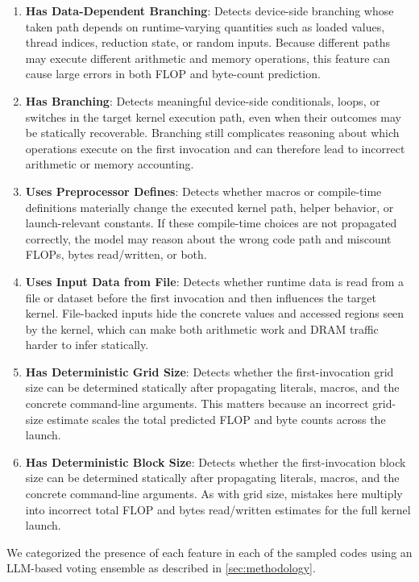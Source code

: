 \begin{enumerate}
    \item \textbf{Has Data-Dependent Branching}: Detects device-side branching whose taken path depends on runtime-varying quantities such as loaded values, thread indices, reduction state, or random inputs. Because different paths may execute different arithmetic and memory operations, this feature can cause large errors in both FLOP and byte-count prediction.
    \item \textbf{Has Branching}: Detects meaningful device-side conditionals, loops, or switches in the target kernel execution path, even when their outcomes may be statically recoverable. Branching still complicates reasoning about which operations execute on the first invocation and can therefore lead to incorrect arithmetic or memory accounting.
    \item \textbf{Uses Preprocessor Defines}: Detects whether macros or compile-time definitions materially change the executed kernel path, helper behavior, or launch-relevant constants. If these compile-time choices are not propagated correctly, the model may reason about the wrong code path and miscount FLOPs, bytes read/written, or both.
    \item \textbf{Uses Input Data from File}: Detects whether runtime data is read from a file or dataset before the first invocation and then influences the target kernel. File-backed inputs hide the concrete values and accessed regions seen by the kernel, which can make both arithmetic work and DRAM traffic harder to infer statically.
    \item \textbf{Has Deterministic Grid Size}: Detects whether the first-invocation grid size can be determined statically after propagating literals, macros, and the concrete command-line arguments. This matters because an incorrect grid-size estimate scales the total predicted FLOP and byte counts across the launch.
    \item \textbf{Has Deterministic Block Size}: Detects whether the first-invocation block size can be determined statically after propagating literals, macros, and the concrete command-line arguments. As with grid size, mistakes here multiply into incorrect total FLOP and bytes read/written estimates for the full kernel launch.
\end{enumerate}
We categorized the presence of each feature in each of the sampled codes using an LLM-based voting ensemble as described in \autoref{sec:methodology}.


